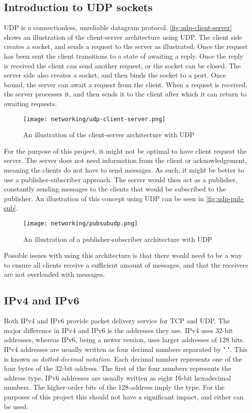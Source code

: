 \subsection{Introduction to UDP sockets}
UDP is a connectionless, unreliable datagram protocol.
\autoref{fig:udp-client-server} shows an illustration of the client-server architecture using UDP.
The client side creates a socket, and sends a request to the server as illustrated.
Once the request has been sent the client transitions to a state of awaiting a reply.
Once the reply is received the client can send another request, or the socket can be closed. 
The server side also creates a socket, and then binds the socket to a port.
Once bound, the server can await a request from the client.
When a request is received, the server processes it, and then sends it to the client after which it can return to awaiting requests.
\begin{figure}[H]
    \centering
    \texttt{[image: networking/udp-client-server.png]}
    \caption{An illustration of the client-server architecture with UDP}
    \label{fig:udp-client-server}
\end{figure}
\noindent
For the purpose of this project, it might not be optimal to have client request the server.
The server does not need information from the client or acknowledgement, meaning the clients do not have to send messages.
As such, it might be better to use a publisher-subscriber approach.
The server would then act as a publisher, constantly sending messages to the clients that would be subscribed to the publisher.
An illustration of this concept using UDP can be seen in \autoref{fig:udp-pub-sub}.
\begin{figure}[H]
    \centering
    \texttt{[image: networking/pubsubudp.png]}
    \caption{An illustration of a publisher-subscriber architecture with UDP}
    \label{fig:udp-pub-sub}
\end{figure}
\noindent
Possible issues with using this architecture is that there would need to be a way to ensure all clients receive a sufficient amount of messages, and that the receivers are not overloaded with messages.

\subsection{IPv4 and IPv6}\label{ipv4-ipv6}
Both IPv4 and IPv6 provide packet delivery service for TCP and UDP.
The major difference in IPv4 and IPv6 is the addresses they use.
IPv4 uses 32-bit addresses, whereas IPv6, being a newer version, uses larger addresses of 128 bits\cite{socketnetworking}.
IPv4 addresses are usually written as four decimal numbers separated by ".".
This is known as \textit{dotted-decimal notation}.
Each decimal number represents one of the four bytes of the 32-bit address.
The first of the four numbers represents the address type.
IPv6 addresses are usually written as eight 16-bit hexadecimal numbers\cite{socketnetworking}.
The higher-order bits of the 128-address imply the type.
For the purposes of this project this should not have a significant impact, and either can be used.

